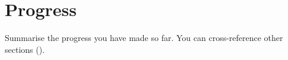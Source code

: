 \section{Progress}
\label{sec:progress}

Summarise the progress you have made so far. You can cross-reference other sections ().